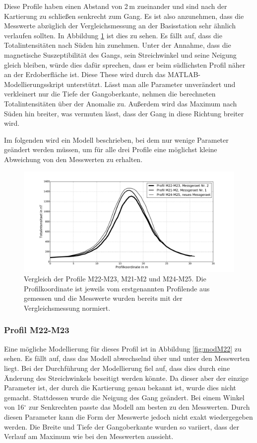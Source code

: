 Diese Profile haben einen Abstand von 2\,m zueinander und sind nach der Kartierung zu schließen senkrecht zum Gang. Es ist also anzunehmen, dass die Messwerte abzüglich der Vergleichsmessung an der Basisstation sehr ähnlich verlaufen sollten. In Abbildung \ref{fig:Vergleich_Profile} ist dies zu sehen. Es fällt auf, dass die Totalintensitäten nach Süden hin zunehmen. Unter der Annahme, dass die magnetische Suszeptibilität des Gangs, sein Streichwinkel und seine Neigung gleich bleiben, würde dies dafür sprechen, dass er beim südlichsten Profil näher an der Erdoberfläche ist. Diese These wird durch das MATLAB-Modellierungsskript unterstützt. Lässt man alle Parameter unverändert und verkleinert nur die Tiefe der Gangoberkante, nehmen die berechneten Totalintensitäten über der Anomalie zu. Außerdem wird das Maximum nach Süden hin breiter, was vermuten lässt, dass der Gang in diese Richtung breiter wird.

Im folgenden wird ein Modell beschrieben, bei dem nur wenige Parameter geändert werden müssen, um für alle drei Profile eine möglichst kleine Abweichung von den Messwerten zu erhalten.

\begin{figure}
 \centering
 \includegraphics[width=\textwidth]{fig/Vergleich_nahe_Profile.pdf}
 \caption[Vergleich der Profile M22-M23, M21-M2 und M24-M25]{Vergleich der Profile M22-M23, M21-M2 und M24-M25. Die Profilkoordinate ist jeweils vom erstgenannten Profilende aus gemessen und die Messwerte wurden bereits mit der Vergleichsmessung normiert.}
 \label{fig:Vergleich_Profile}
\end{figure}

\subsubsection{Profil M22-M23}

Eine mögliche Modellierung für dieses Profil ist in Abbildung \ref{fig:modM22} zu sehen. Es fällt auf, dass das Modell abwechselnd über und unter den Messwerten liegt. Bei der Durchführung der Modellierung fiel auf, dass dies durch eine Änderung des Streichwinkels beseitigt werden könnte. Da dieser aber der einzige Parameter ist, der durch die Kartierung genau bekannt ist, wurde dies nicht gemacht. Stattdessen wurde die Neigung des Gang geändert. Bei einem Winkel von 16$^\circ$ zur Senkrechten passte das Modell am besten zu den Messwerten. Durch diesen Parameter kann die Form der Messwerte jedoch nicht exakt wiedergegeben werden. Die Breite und Tiefe der Gangoberkante wurden so variiert, dass der Verlauf am Maximum wie bei den Messwerten aussieht.

